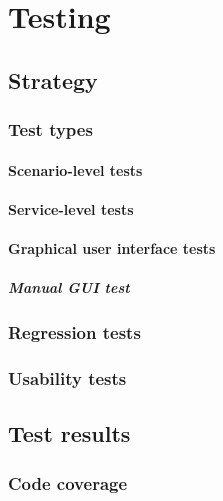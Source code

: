\chapter{Testing}
\label{Testing}

\section{Strategy}
\label{Testing_Strategy}

\subsection{Test types}
\label{Testing_Strategy_Types}

\subsubsection{Scenario-level tests}
\label{Testing_Strategy_Types_Scenario}

\subsubsection{Service-level tests}
\label{Testing_Strategy_Types_Service}

\subsubsection{Graphical user interface tests}
\label{Testing_Strategy_Types_EndUser}

\paragraph{Manual GUI test}

\subsection{Regression tests}
\label{Testing_Strategy_Regression}

\subsection{Usability tests}
\label{Testing_Strategy_Usability}

\section{Test results}
\label{Testing_Results}

\subsection{Code coverage}
\label{Testing_Results_Coverage}

